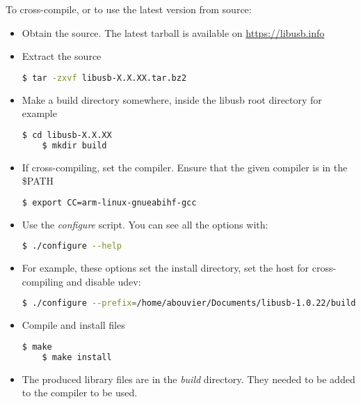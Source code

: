 \documentclass{article}
\begin{document}
    To cross-compile, or to use the latest version from source:
    \begin{itemize}
    	\itemsep0em
    	\item Obtain the source. The latest tarball is available on \url{https://libusb.info}
    	\item Extract the source
    	
    \begin{lstlisting}[language=bash]
    $ tar -zxvf libusb-X.X.XX.tar.bz2
    \end{lstlisting}
    
    	\item Make a build directory somewhere, inside the libusb root directory for example
    	
    \begin{lstlisting}[language=bash]
    $ cd libusb-X.X.XX
    $ mkdir build
    \end{lstlisting}
    
    	\item If cross-compiling, set the compiler. Ensure that the given compiler is in the \$PATH
    	
    \begin{lstlisting}[language=bash]
    $ export CC=arm-linux-gnueabihf-gcc
    \end{lstlisting}
    
    	\item Use the \textit{configure} script. You can see all the options with:
    	
    \begin{lstlisting}[language=bash]
    $ ./configure --help
    \end{lstlisting}
    
    	\item For example, these options set the install directory, set the host for cross-compiling and disable udev:
    
    \begin{lstlisting}[language=bash]
    $ ./configure --prefix=/home/abouvier/Documents/libusb-1.0.22/build --exec-prefix=/home/abouvier/Documents/libusb-1.0.22/build --host=arm-linux-gnueabihf --disable-udev
    \end{lstlisting}
    
    \item Compile and install files
    
    \begin{lstlisting}[language=bash]
    $ make
    $ make install
    \end{lstlisting}
    
    \item The produced library files are in the \textit{build} directory. They needed to be added to the compiler to be used. 
    
    \end{itemize}
    
\end{document}
